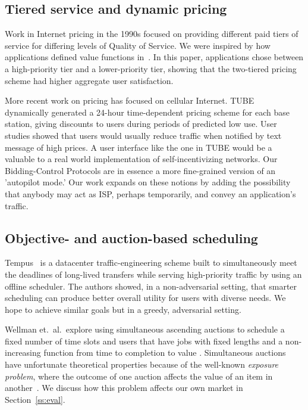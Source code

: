 \subsection{Tiered service and dynamic pricing}
Work in Internet pricing in the 1990s focused on providing different
paid tiers of service for differing levels of Quality of Service.  We
were inspired by how applications defined value functions
in~\cite{cocchi93}. In this paper, applications chose between a
high-priority tier and a lower-priority tier, showing that the
two-tiered pricing scheme had higher aggregate user satisfaction.

More recent work on pricing has focused on cellular
Internet. TUBE~\cite{tube12} dynamically generated a 24-hour
time-dependent pricing scheme for each base station, giving discounts
to users during periods of predicted low use. User studies showed that users would
usually reduce traffic when notified by text message of high prices.
A user interface like the
one in TUBE would be a valuable to a real world implementation of
self-incentivizing networks. Our Bidding-Control Protocols are in
essence a more fine-grained version of an 'autopilot mode.' Our work expands on these notions by adding
the possibility that anybody may act as ISP, perhaps temporarily, and convey an application's traffic.

\subsection{Objective- and auction-based scheduling}
Tempus~\cite{tempus14} is a datacenter traffic-engineering scheme built to simultaneously meet the deadlines of long-lived transfers while serving high-priority traffic by using an offline scheduler.
The authors showed, in a non-adversarial setting, that smarter scheduling can produce better overall utility for users with diverse needs. We hope to achieve similar goals but in a greedy, adversarial setting.

Wellman et.~al.~explore using simultaneous ascending auctions to
schedule a fixed number of time slots and users that have jobs with
fixed lengths and a non-increasing function from time to completion to
value \cite{wellman01, wellman05}. Simultaneous auctions have
unfortunate theoretical properties because of the well-known
\emph{exposure problem}, where the outcome of one auction affects the
value of an item in another~\cite{milgrom00, englmaier06}. We discuss how this problem affects
our own market in Section~\ref{ss:eval}.






















